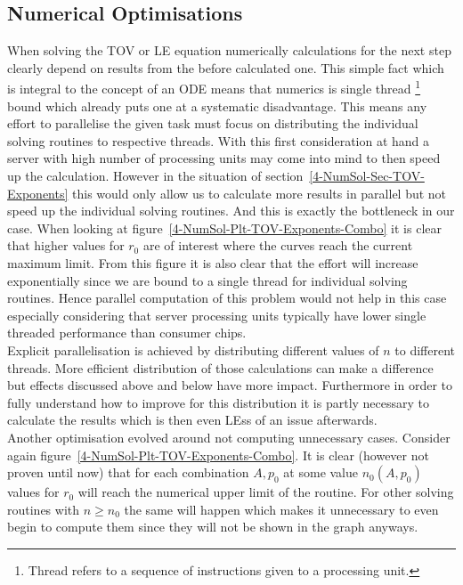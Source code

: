 \begin{appendix}
\begin{section}
\subsection{Numerical Optimisations}
\label{99-App-Numerical-Optimisations}
When solving the \ac{TOV} or \ac{LE} equation numerically calculations for the next step clearly depend on results from the before calculated one.
This simple fact which is integral to the concept of an \ac{ODE} means that numerics is single thread \footnote{Thread refers to a sequence of instructions given to a processing unit.} bound which already puts one at a systematic disadvantage.
This means any effort to parallelise the given task must focus on distributing the individual solving routines to respective threads.
With this first consideration at hand a server with high number of processing units may come into mind to then speed up the calculation.
However in the situation of section~\ref{4-NumSol-Sec-TOV-Exponents} this would only allow us to calculate more results in parallel but not speed up the individual solving routines.
And this is exactly the bottleneck in our case.
When looking at figure~\ref{4-NumSol-Plt-TOV-Exponents-Combo} it is clear that higher values for $r_0$ are of interest where the curves reach the current maximum limit.
From this figure it is also clear that the effort will increase exponentially since we are bound to a single thread for individual solving routines.
Hence parallel computation of this problem would not help in this case especially considering that server processing units typically have lower single threaded performance than consumer chips.\\
Explicit parallelisation is achieved by distributing different values of $n$ to different threads. 
More efficient distribution of those calculations can make a difference but effects discussed above and below have more impact.
Furthermore in order to fully understand how to improve for this distribution it is partly necessary to calculate the results which is then even \ac{LE}ss of an issue afterwards.\\
Another optimisation evolved around not computing unnecessary cases.
Consider again figure~\ref{4-NumSol-Plt-TOV-Exponents-Combo}.
It is clear (however not proven until now) that for each combination $A,p_0$ at some value $n_0(A,p_0)$ values for $r_0$ will reach the numerical upper limit of the routine.
For other solving routines with $n\geq n_0$ the same will happen which makes it unnecessary to even begin to compute them since they will not be shown in the graph anyways.

\end{section}
\end{appendix}
